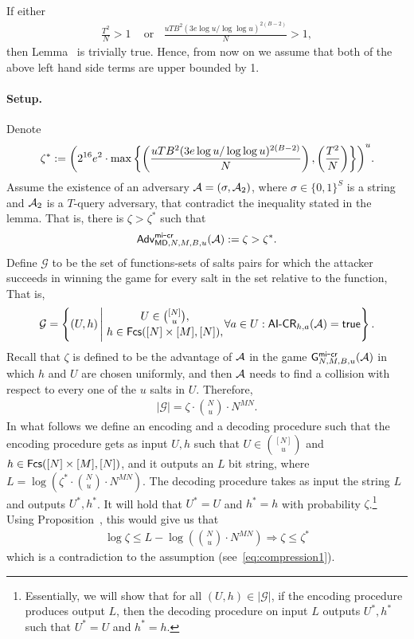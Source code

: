 If either\begin{align*}
\frac{T^2}{N}>1\;\;\; \text{ or } \;\;\frac{uTB^2(3e\log u/\log\log u)^{2(B-2)}}{N}>1,
\end{align*}
 then Lemma~ is trivially true. Hence, from now on we assume that both of the above left hand side terms are upper bounded by 1.

\paragraph{Setup.} Denote 
\begin{align*}
\zeta^* := {\left({2^{16}} e^2\cdot \max\left\{\left(\frac{uTB^2(3e\log u/\log \log u)^{2({B-2})}}{N}\right),\left(\frac{T^2}{N}\right)\right\}\right)}^u.
\end{align*}
%
Assume the existence of an adversary $\mathcal{A} = (\sigma,\mathcal{A}_2)$, where $\sigma\in \{0,1\}^S$ is a string and $\mathcal{A}_2$ is a $T$-query adversary, that contradict the inequality stated in the lemma. That is, there is $\zeta > \zeta^*$ such that
\begin{align}
\mathsf{Adv}_{\mathsf{MD},N,M,B,u}^{{\mathsf{mi}\mbox{-}\mathsf{cr}}}(\mathcal{A})  := \zeta > \zeta^*. \label{eq:compression1}
\end{align}
 Define $\mathcal{G}$ to be the set of functions-sets of salts pairs for which the attacker succeeds in winning the game for every salt in the set relative to the function, That is, 
\begin{align*}
\mathcal{G}=\left\{(U,h) \,\middle\vert\, \MyAtop{U\in \binom{[N]}{u},}{h\in \FuncNM,} \forall a \in U:\AICR_{h,a}(\advA)=\true\right\}.
\end{align*}
%
Recall that $\zeta$ is defined to be the advantage of $\mathcal{A}$ in the game $\mathsf{G}^{\mathsf{mi}\mbox{-}\mathsf{cr}}_{N,M,B,u}(\mathcal{A})$ in which $h$ and $U$ are chosen uniformly, and then $\mathcal{A}$ needs to find a collision with respect to every one of the  $u$ salts in $U$. Therefore, 
\begin{align*}
| \mathcal G | = \zeta \cdot \binom{N}{u}\cdot N^{MN}.
\end{align*}
In what follows we define an encoding and a decoding procedure such that the encoding procedure gets as input $U,h$ such that $U\in \binom{[N]}{u}$ and $h\in \mathsf{Fcs}([N]\times [M],[N])$, and it outputs an $L$ bit string, where $L = \log \left(\zeta^* \cdot \binom{N}{u}\cdot N^{MN}\right)$. The decoding procedure takes as input the string $L$ and outputs $U^*,h^*$. It will hold that $U^*=U$ and $h^* = h$ with probability $\zeta$.\footnote{Essentially, we will show that for all $(U,h)\in |\mathcal{G}|$, if the encoding procedure produces output $L$, then the decoding procedure on input $L$ outputs $U^*,h^*$ such that $U^*=U$ and $h^* = h$.}
Using Proposition~, this would give us that 
\begin{align*}
\log \zeta \le  L - \log \left(\binom{N}{u}\cdot N^{MN}\right) \Longrightarrow \zeta \le \zeta^*
\end{align*}
 which is a contradiction to the assumption (see~\eqref{eq:compression1}). 
 

